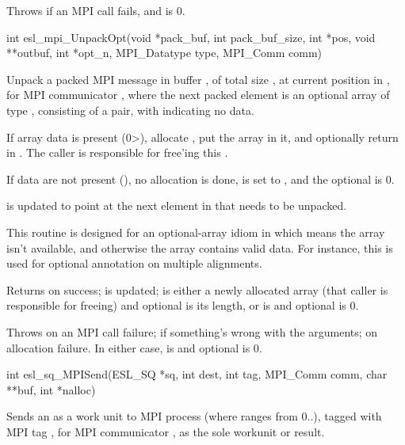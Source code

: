 \begin{sreapi}
Throws  if an MPI call fails, and  is 0.           


\hypertarget{func:esl_mpi_UnpackOpt()}
{\item[int esl\_mpi\_UnpackOpt(void *pack\_buf, int pack\_buf\_size, int *pos, void **outbuf, int *opt\_n, MPI\_Datatype type, MPI\_Comm comm)]}

Unpack a packed MPI message in buffer , of total size
, at current position  in ,
for MPI communicator , where the next packed element is an optional
array of type , consisting of a  pair, with 
indicating no data. 

If array data is present (0>), allocate ,
put the array in it, and optionally return  in
. The caller is responsible for free'ing this
.

If data are not present (), no allocation is done,
 is set to , and the optional  is
0.

 is updated to point at the next element in 
that needs to be unpacked.

This routine is designed for an optional-array idiom in
which  means the array isn't available, and
otherwise the array contains valid data. For instance,
this is used for optional annotation on multiple
alignments. 

Returns  on success;  is updated;  is either a newly allocated 
array (that caller is responsible for freeing) and optional 
is its length, or  is  and optional  is 0.

Throws  on an MPI call failure;  if something's wrong
with the arguments;  on allocation failure. 
In either case,  is  and optional  is 0.


\hypertarget{func:esl_sq_MPISend()}
{\item[int esl\_sq\_MPISend(ESL\_SQ *sq, int dest, int tag, MPI\_Comm comm, char **buf, int *nalloc)]}

Sends an   as a work unit to MPI process
 (where  ranges from 0..), tagged
with MPI tag , for MPI communicator , as 
the sole workunit or result. 


\end{sreapi}

